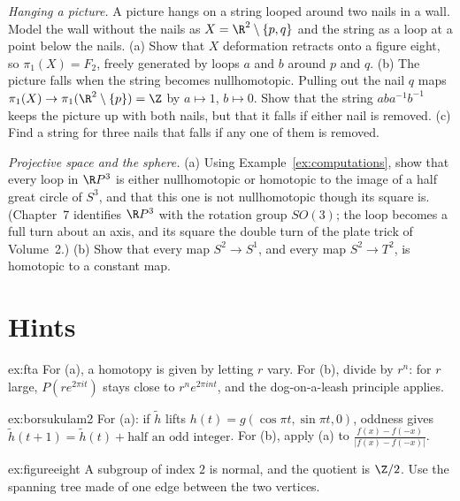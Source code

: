 \begin{exercise}[$\star\star$]\label{ex:picture}
\emph{Hanging a picture.} A picture hangs on a string looped around two nails in a wall. Model the wall without the nails as $X=\R^2\setminus\{p,q\}$ and the string as a loop at a point below the
nails. (a) Show that $X$ deformation retracts onto a figure eight, so $\pi_1(X)=F_2$, freely generated by loops $a$ and $b$ around $p$ and $q$. (b) The picture falls when the string becomes
nullhomotopic. Pulling out the nail $q$ maps $\pi_1(X)\to\pi_1(\R^2\setminus\{p\})=\Z$ by $a\mapsto1$, $b\mapsto0$. Show that the string $aba^{-1}b^{-1}$ keeps the picture up with both nails, but that it falls
if either nail is removed. (c) Find a string for three nails that falls if any one of them is removed.
\end{exercise}

\begin{exercise}[$\star$]\label{ex:rp3}
\emph{Projective space and the sphere.} (a) Using Example~\ref{ex:computations}, show that every loop in $\R P^3$ is either nullhomotopic or homotopic to the image of a half great circle of $S^3$,
and that this one is not nullhomotopic though its square is. (Chapter~7 identifies $\R P^3$ with the rotation group $SO(3)$; the loop becomes a full turn about an axis, and its square the double turn
of the plate trick of Volume~2.) (b) Show that every map $S^2\to S^1$, and every map $S^2\to T^2$, is homotopic to a constant map.
\end{exercise}

\section{Hints}

\begin{hint}{ex:fta}
For (a), a homotopy is given by letting $r$ vary. For (b), divide by $r^n$: for $r$ large, $P(re^{2\pi it})$ stays close to $r^ne^{2\pi int}$, and the dog-on-a-leash principle applies.
\end{hint}

\begin{hint}{ex:borsukulam2}
For (a): if $\tilde h$ lifts $h(t)=g(\cos\pi t,\sin\pi t,0)$, oddness gives $\tilde h(t+1)=\tilde h(t)+\text{half an odd integer}$. For (b), apply (a) to $\frac{f(x)-f(-x)}{|f(x)-f(-x)|}$.
\end{hint}

\begin{hint}{ex:figureeight}
A subgroup of index $2$ is normal, and the quotient is $\Z/2$. Use the spanning tree made of one edge between the two vertices.
\end{hint}

